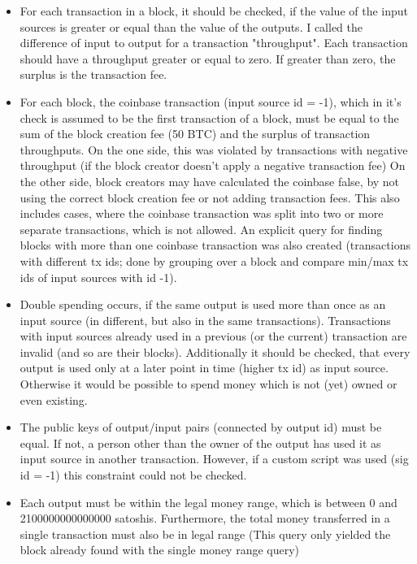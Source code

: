 \documentclass[12pt,a4paper]{article}
\begin{document}
\begin{itemize}
\item For each transaction in a block, it should be checked, if the value of the
input sources is greater or equal than the value of the outputs. I called the difference of input to output for a transaction "throughput".
Each transaction should have a throughput greater or equal to zero. If greater than zero, the surplus is the transaction fee.\newline
\item For each block, the coinbase transaction (input source id = -1), which in it's check is assumed to be the first transaction of a block, must be equal to the sum of the block creation fee (50 BTC)
and the surplus of transaction throughputs.\newline
On the one side, this was violated by transactions with negative throughput (if the block creator doesn't apply a negative transaction fee)\newline
On the other side, block creators may have calculated the coinbase false, by not using the correct block creation fee or not adding transaction fees. This also includes cases, where the coinbase transaction was
split into two or more separate transactions, which is not allowed.
An explicit query for finding blocks with more than one coinbase transaction was also created (transactions with different tx ids; done by grouping over a block and compare min/max tx ids of input sources with id -1).\newline
\item Double spending occurs, if the same output is used more than once as an input source (in different, but also in the same transactions). Transactions with input sources already
used in a previous (or the current) transaction are invalid (and so are their blocks).\newline
Additionally it should be checked, that every output is used only at a later point in time (higher tx id) as input source.
Otherwise it would be possible to spend money which is not (yet) owned or even existing.\newline
\item The public keys of output/input pairs (connected by output id) must be equal. If not, a person other than the owner of the output has used it as
input source in another transaction. However, if a custom script was used (sig id = -1) this constraint could not be checked.\newline
\item Each output must be within the legal money range, which is between 0 and 2100000000000000 satoshis.\newline
Furthermore, the total money transferred in a single transaction must also be in legal range (This query only yielded the block already found with the single money range query)\newline
\end{itemize}
\end{document}
